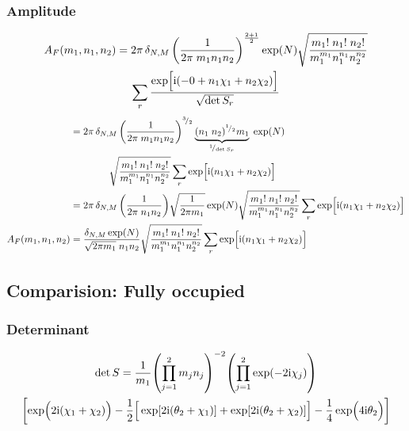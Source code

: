 \documentclass[
	english,
	a4paper,
	fontsize=10pt,
	parskip=half,
	titlepage=true,
	DIV=12,
	final
]{scrreprt}
\newcommand*{\smallfrac}  [2]{\ensuremath{{}^        {#1} \!/_        {#2}}}
\newcommand*{\iunit}{\ensuremath{\mathrm{i}}}
\begin{document}
\subsubsection{Amplitude}
\begin{multline}
	A_F(m_1, n_1, n_2)
=
	2\pi \, \delta_{N,M} \, \qty(
		\frac{1}{2\pi \; m_1 n_1 n_2}
	)^{\frac{2 +1}{2}}
	\exp(N)
	\sqrt{\frac
		{ m_1! \; n_1! \; n_2! }
		{ m_1^{m_1} n_1^{n_1} n_2^{n_2} }
	}
\\
	\sum_r
		\frac
		{\exp[ \Big.
			\iunit \qty( -0 + 
			n_1 \chi_1 + n_2 \chi_2)
		]}
		{\sqrt{\det S_r}}
\end{multline}
\begin{align}
\nonumber
&=
	2\pi \, \delta_{N,M} \, \qty(
		\frac{1}{2\pi \; m_1 n_1 n_2}
	)^{\smallfrac{3}{2}}
	\underbrace{
		(n_1 \; n_2)^{\smallfrac{1}{2}} m_1
	}_{\smallfrac{1}{\det S_r}} \;
	\exp(N)
	\\ & \qquad\qquad
	\sqrt{\frac
		{ m_1! \; n_1! \; n_2! }
		{ m_1^{m_1} n_1^{n_1} n_2^{n_2} }
	}
	\sum_r
		\exp[ \Big.
			\iunit \qty(  
			n_1 \chi_1 + n_2 \chi_2)
		]
	\\
&=
	2\pi \, \delta_{N,M} \, \qty(
		\frac{1}{2\pi \; n_1 n_2}
	)
	\sqrt{\frac{1}{2\pi m_1}}
	\exp(N)
	\sqrt{\frac
		{ m_1! \; n_1! \; n_2! }
		{ m_1^{m_1} n_1^{n_1} n_2^{n_2} }
	}
	\sum_r
		\exp[ \Big.
			\iunit \qty(  
			n_1 \chi_1 + n_2 \chi_2)
		]
\\
	A_F(m_1, n_1, n_2)
&=
	\frac
		{ \delta_{N,M} \exp(N) }
		{ \sqrt{2\pi m_1} \; n_1 n_2 }
	\sqrt{\frac
		{ m_1! \; n_1! \; n_2! }
		{ m_1^{m_1} n_1^{n_1} n_2^{n_2} }
	}
	\sum_r
		\exp[ \Big.
			\iunit \qty(  
			n_1 \chi_1 + n_2 \chi_2)
		]
\end{align}


\subsection{Comparision: Fully occupied}
\subsubsection{Determinant}
\begin{multline*}
	\det S
=
	\frac{1}{m_1}
	\qty( \prod_{j=1}^{2} m_j n_j)^{-2}
	\qty( \prod_{j=1}^{2} \exp(-2\iunit \chi_j) )
\\
	\qty[
		\exp( \Big. 2\iunit (\chi_1 + \chi_2) )
		-\frac{1}{2} \qty[ \Big.
			\exp[2\iunit (\theta_2 + \chi_1)] +
			\exp[2\iunit (\theta_2 + \chi_2)]
		]
		-
		\frac{1}{4}\exp( \Big. 4\iunit \theta_2 )
	]
\end{multline*}
\end{document}
